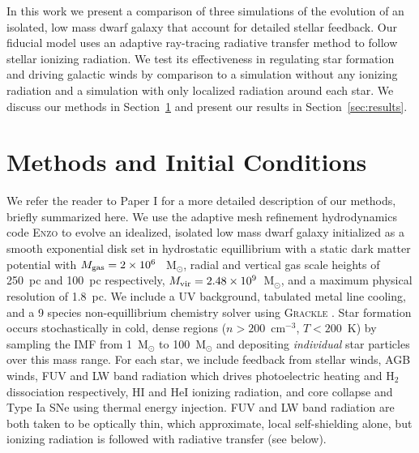 \documentclass[twocolumn]{aastex62}
\begin{document}
In this work we present a comparison of three simulations of the evolution of an isolated, low mass dwarf galaxy that account for detailed stellar feedback. Our fiducial model uses an adaptive ray-tracing radiative transfer method to follow stellar ionizing radiation. We test its effectiveness in regulating star formation and driving galactic winds by comparison to a simulation without any ionizing radiation and a simulation with only localized radiation around each star. We discuss our methods in Section~\ref{sec:methods} and present our results in Section~\ref{sec:results}.

\section{Methods and Initial Conditions} \label{sec:methods}
We refer the reader to Paper I for a more detailed description of our methods, briefly summarized here. We use the adaptive mesh refinement hydrodynamics code \textsc{Enzo} \citep{Enzo2014} to evolve an idealized, isolated low mass dwarf galaxy initialized as a smooth exponential disk set in hydrostatic equillibrium with a static dark matter potential \citep{Burkert} with $M_{\rm gas} = 2 \times 10^6~$~M$_{\odot}$, radial and vertical gas scale heights of 250~pc and 100~pc respectively, $M_{\rm vir} = 2.48 \times 10^9$~M$_{\odot}$, and a maximum physical resolution of 1.8~pc. We include a UV background, tabulated metal line cooling, and a 9 species non-equillibrium chemistry solver using \textsc{Grackle} \citep{GrackleMethod}. Star formation occurs stochastically in cold, dense regions ($n > 200$~cm$^{-3}$, $T < 200$~K) by sampling the \cite{Salpeter1955} IMF from 1~M$_{\odot}$ to 100~M$_{\odot}$ and depositing \textit{individual} star particles over this mass range. For each star, we include feedback from stellar winds, AGB winds, FUV and LW band radiation which drives photoelectric heating and H$_2$ dissociation respectively, HI and HeI ionizing radiation, and core collapse and Type Ia SNe using thermal energy injection. FUV and LW band radiation are both taken to be optically thin, which approximate, local self-shielding alone, but ionizing radiation is followed with radiative transfer (see below). 
\end{document}

